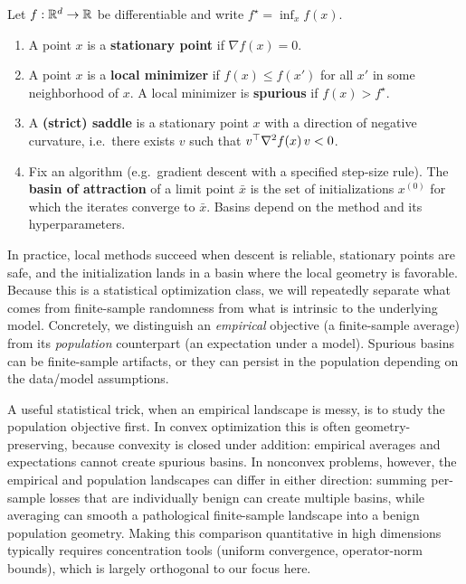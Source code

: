 \documentclass[11pt]{article}
\begin{document}
\begin{definition}
\label{def:basic-vocab-nonconvex}
Let $f:\mathbb{R}^d\to\mathbb{R}$ be differentiable and write $f^\star=\inf_x f(x)$.
\begin{enumerate}[leftmargin=*]
  \item A point $x$ is a \textbf{stationary point} if $\nabla f(x)=0$.
  \item A point $x$ is a \textbf{local minimizer} if $f(x)\le f(x')$ for all $x'$ in some neighborhood of $x$.
  A local minimizer is \textbf{spurious} if $f(x)>f^\star$.
  \item A \textbf{(strict) saddle} is a stationary point $x$ with a direction of negative curvature, i.e.\ there exists $v$ such that $v^\top \nabla^2 f(x)\,v<0$.
  \item Fix an algorithm (e.g.\ gradient descent with a specified step-size rule).
  The \textbf{basin of attraction} of a limit point $\bar x$ is the set of initializations $x^{(0)}$ for which the iterates converge to $\bar x$.
  Basins depend on the method and its hyperparameters.
\end{enumerate}
\end{definition}

In practice, local methods succeed when descent is reliable, stationary points are safe, and the initialization lands in a basin where the local geometry is favorable.
Because this is a statistical optimization class, we will repeatedly separate what comes from finite-sample randomness from what is intrinsic to the underlying model.
Concretely, we distinguish an \emph{empirical} objective (a finite-sample average) from its \emph{population} counterpart (an expectation under a model).
Spurious basins can be finite-sample artifacts, or they can persist in the population depending on the data/model assumptions.

A useful statistical trick, when an empirical landscape is messy, is to study the population objective first.
In convex optimization this is often geometry-preserving, because convexity is closed under addition: empirical averages and expectations cannot create spurious basins.
In nonconvex problems, however, the empirical and population landscapes can differ in either direction:
summing per-sample losses that are individually benign can create multiple basins, while averaging can smooth a pathological finite-sample landscape into a benign population geometry.
Making this comparison quantitative in high dimensions typically requires concentration tools (uniform convergence, operator-norm bounds), which is largely orthogonal to our focus here.
\end{document}
